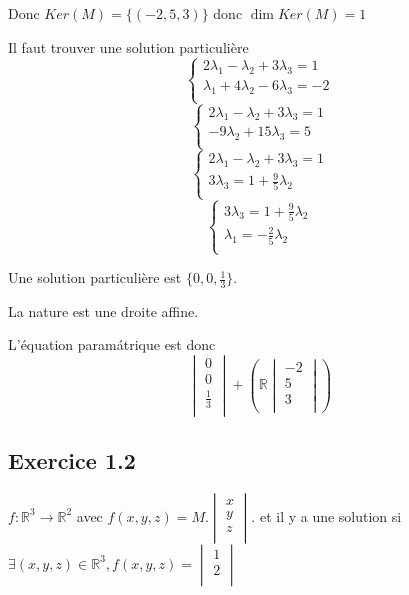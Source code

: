 \documentclass[]{book}
\theoremstyle{definition}
\newcommand{\bb}[1]{\mathbb{#1}}
\newcommand{\R}{\bb{R}}
\begin{document}
Donc $Ker(M) = \{(-2, 5, 3)\}$ donc $\dim Ker(M) = 1$

Il faut trouver une solution particuli\`ere
$$
\left\{ 
    \begin{array}{l}
        2\lambda_1 - \lambda_2 + 3 \lambda_3 = 1 \\
        \lambda_1 + 4 \lambda_2 - 6\lambda_3 = -2 \\
    \end{array}
\right.
$$
$$
\left\{ 
    \begin{array}{l}
        2\lambda_1 - \lambda_2 + 3 \lambda_3 = 1 \\
        -9 \lambda_2 +15 \lambda_3 = 5 \\
    \end{array}
\right.
$$
$$
\left\{ 
    \begin{array}{l}
        2\lambda_1 - \lambda_2 + 3 \lambda_3 = 1 \\
        3 \lambda_3 = 1 + \frac{9}{5} \lambda_2\\
    \end{array}
\right.
$$
$$
\left\{ 
    \begin{array}{l}
        3\lambda_3 = 1 + \frac{9}{5}\lambda_2 \\
        \lambda_1 = - \frac{2}{5}\lambda_2 \\
    \end{array}
\right.
$$

Une solution particuli\`ere est $\{0,0,\frac{1}{3}\}$. 

La nature est une droite affine.

L'\'equation param\'atrique est donc
$$
\begin{vmatrix}
    0 \\
    0 \\
    \frac{1}{3} \\
\end{vmatrix}
+
(\R\begin{vmatrix}
   -2 \\
   5 \\
   3 \\ 
\end{vmatrix})
$$

\subsection*{Exercice 1.2}
$f: \R^3 \to \R^2$ avec $f(x,y,z) = M.\begin{vmatrix}
    x \\ y \\ z \\
\end{vmatrix}
$.
et il y a une solution si $\exists (x,y,z) \in \R^3, f(x,y,z) = \begin{vmatrix}
    1 \\ 2 \\
\end{vmatrix}
$
\end{document}
